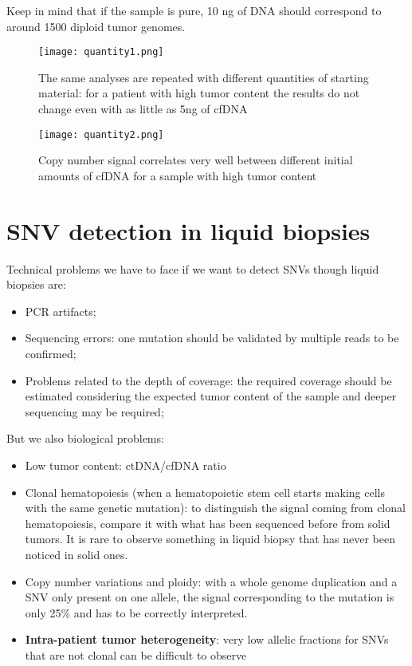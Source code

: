 Keep in mind that if the sample is pure, 10 ng of DNA should correspond to around 1500 diploid tumor genomes.

\begin{figure}[H]
    \centering
    \texttt{[image: quantity1.png]}
    \caption{The same analyses are repeated with different quantities of starting material: for a patient with high tumor content the results do not change even with as little as 5ng of cfDNA}
    \label{fig:quan}
\end{figure}

\begin{figure}[H]
    \centering
    \texttt{[image: quantity2.png]}
    \caption{Copy number signal correlates very well between different initial amounts of cfDNA for a sample with high tumor content}
    \label{fig:quan2}
\end{figure}



\section{SNV detection in liquid biopsies}
Technical problems we have to face if we want to detect SNVs though liquid biopsies are:
\begin{itemize}
    \item PCR artifacts;
    \item Sequencing errors: one mutation should be validated by multiple reads to be confirmed;
    \item Problems related to the depth of coverage: the required coverage should be estimated considering the expected tumor content of the sample and deeper sequencing may be required;
\end{itemize}

But we also biological problems:

\begin{itemize}
    \item Low tumor content: ctDNA/cfDNA ratio
    \item Clonal hematopoiesis (when a hematopoietic stem cell starts making cells with the same genetic mutation): to distinguish the signal coming from clonal hematopoiesis, compare it with what has been sequenced before from solid tumors. It is rare to observe something in liquid biopsy that has never been noticed in solid ones.
    \item Copy number variations and ploidy: with a whole genome duplication and a SNV only present on one allele, the signal corresponding to the mutation is only 25\% and has to be correctly interpreted.
    \item \textbf{Intra-patient tumor heterogeneity}: very low allelic fractions for SNVs that are not clonal can be difficult to observe
\end{itemize}

